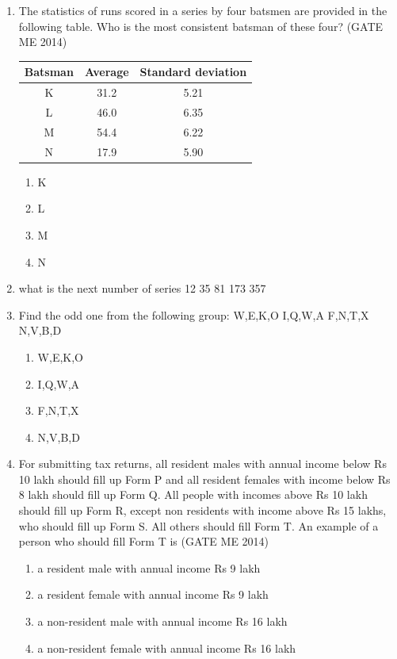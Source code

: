 \documentclass[journal]{IEEEtran}
\numberwithin{equation}{enumi}
\numberwithin{figure}{enumi}
\begin{document}
\begin{enumerate}
\item 
The statistics of runs scored in a series by four batsmen are provided in the following table. Who is the most consistent batsman of these four?
\hfill{(GATE ME 2014)}
 \begin{table}[h!]
\centering
\begin{tabular}{|c|c|c|}
\hline
\textbf{Batsman} & \textbf{Average} & \textbf{Standard deviation} \\
\hline
K & 31.2 & 5.21 \\
\hline
L & 46.0 & 6.35 \\
\hline
M & 54.4 & 6.22 \\
\hline
N & 17.9 & 5.90 \\
\hline
\end{tabular}
\end{table}

\begin{multicols}{4}
    \begin{enumerate}
        \item K
        \item L
        \item M
        \item N
    \end{enumerate}
\end{multicols}

\item what is the next number of series 12 35 81 173 357

\item Find the odd one from the following group:
W,E,K,O  \quad   I,Q,W,A \quad      F,N,T,X   \quad      N,V,B,D\\
 \begin{multicols}{4}
\begin{enumerate}
    \item W,E,K,O
    \item I,Q,W,A
    \item F,N,T,X
    \item N,V,B,D
\end{enumerate}   
\end{multicols}

\item For submitting tax returns, all resident males with annual income below Rs 10 lakh should fill up Form P and all resident females with income below Rs 8 lakh should fill up Form Q. All people with incomes above Rs 10 lakh should fill up Form R, except non residents with income above Rs 15 lakhs, who should fill up Form S. All others should fill Form T. An example of a person who should fill Form T is
\hfill{(GATE ME 2014)}
 \begin{enumerate}
\item a resident male with annual income Rs 9 lakh
\item a resident female with annual income Rs 9 lakh
\item  a non-resident male with annual income Rs 16 lakh
\item a non-resident female with annual income Rs 16 lakh
\end{enumerate}


\end{enumerate}
\end{document}
